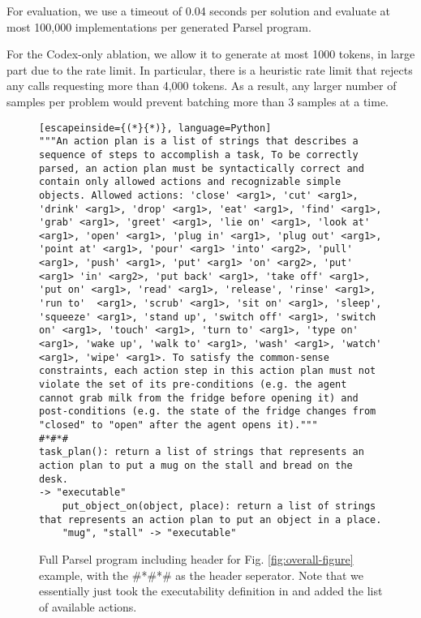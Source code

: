 For evaluation, we use a timeout of 0.04 seconds per solution and evaluate at most 100,000 implementations per generated Parsel program. 
 
 For the Codex-only ablation, we allow it to generate at most 1000 tokens, in large part due to the rate limit. In particular, there is a heuristic rate limit that rejects any calls requesting more than 4,000 tokens. As a result, any larger number of samples per problem would prevent batching more than 3 samples at a time.

\begin{figure*}[h] 
\begin{lstlisting}[escapeinside={(*}{*)}, language=Python]
"""An action plan is a list of strings that describes a sequence of steps to accomplish a task, To be correctly parsed, an action plan must be syntactically correct and contain only allowed actions and recognizable simple objects. Allowed actions: 'close' <arg1>, 'cut' <arg1>, 'drink' <arg1>, 'drop' <arg1>, 'eat' <arg1>, 'find' <arg1>, 'grab' <arg1>, 'greet' <arg1>, 'lie on' <arg1>, 'look at' <arg1>, 'open' <arg1>, 'plug in' <arg1>, 'plug out' <arg1>, 'point at' <arg1>, 'pour' <arg1> 'into' <arg2>, 'pull' <arg1>, 'push' <arg1>, 'put' <arg1> 'on' <arg2>, 'put' <arg1> 'in' <arg2>, 'put back' <arg1>, 'take off' <arg1>, 'put on' <arg1>, 'read' <arg1>, 'release', 'rinse' <arg1>, 'run to'  <arg1>, 'scrub' <arg1>, 'sit on' <arg1>, 'sleep', 'squeeze' <arg1>, 'stand up', 'switch off' <arg1>, 'switch on' <arg1>, 'touch' <arg1>, 'turn to' <arg1>, 'type on' <arg1>, 'wake up', 'walk to' <arg1>, 'wash' <arg1>, 'watch' <arg1>, 'wipe' <arg1>. To satisfy the common-sense constraints, each action step in this action plan must not violate the set of its pre-conditions (e.g. the agent cannot grab milk from the fridge before opening it) and post-conditions (e.g. the state of the fridge changes from "closed" to "open" after the agent opens it)."""
#*#*#
task_plan(): return a list of strings that represents an action plan to put a mug on the stall and bread on the desk.
-> "executable"
    put_object_on(object, place): return a list of strings that represents an action plan to put an object in a place. 
    "mug", "stall" -> "executable"
\end{lstlisting} 
\caption{Full Parsel program including header for Fig.  \ref{fig:overall-figure} example, with the \#*\#*\# as the header seperator. Note that we essentially just took the executability definition in \citep{huang2022language} and added the list of available actions. \label{virtualhome_header}}
\end{figure*}

